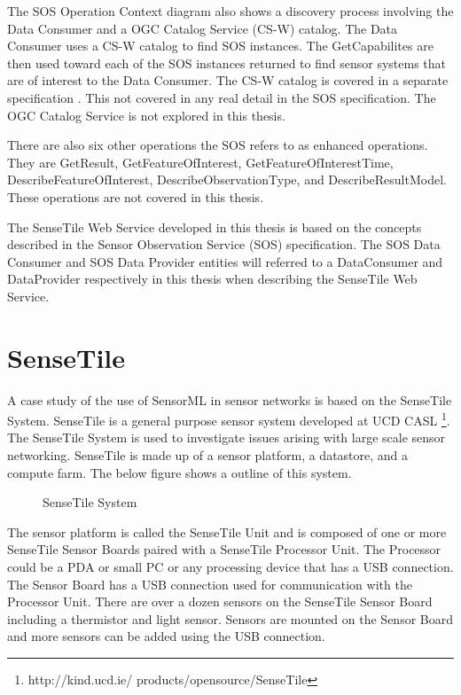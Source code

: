 \documentclass[]{final_report}
\begin{document}
The SOS Operation Context diagram also shows a discovery process involving the  Data Consumer and a OGC Catalog Service (CS-W) catalog. The Data Consumer uses a CS-W catalog to find SOS instances. The GetCapabilites are then used toward each of the SOS instances returned to find sensor systems that are of interest to the Data Consumer. The CS-W catalog is covered in a separate specification \cite{OGCcatref}. This not covered in any real detail in the SOS specification. The OGC Catalog Service is not explored in this thesis.

There are also six other operations the SOS refers to as enhanced operations. They are GetResult,
GetFeatureOfInterest, GetFeatureOfInterestTime, DescribeFeatureOfInterest,
DescribeObservationType, and DescribeResultModel. These operations are not covered in this thesis.

The SenseTile Web Service developed in this thesis is based on the concepts described in the Sensor Observation Service (SOS) specification. The SOS Data Consumer and SOS Data Provider entities will referred to a DataConsumer and DataProvider respectively in this thesis when describing the SenseTile Web Service.


\section{SenseTile}
A case study of the use of SensorML in sensor networks is based on the SenseTile System. SenseTile is a general purpose sensor system developed at UCD CASL \footnote{http://kind.ucd.ie/
products/opensource/SenseTile}. The SenseTile System is used to investigate issues arising with large scale sensor networking. SenseTile is made up of a sensor platform, a datastore, and a compute farm. The below figure shows a outline of this system. 
\begin{figure}[h]
\centering
{}
\caption{SenseTile System}\label{fig:SenseTileDescription}
\end{figure}
 The sensor platform is called the SenseTile Unit and is composed of one or more SenseTile Sensor Boards paired with a SenseTile Processor Unit. The Processor could be a PDA or small PC or any processing device that has a USB connection.  The Sensor Board has a USB connection used for communication with the Processor Unit. There are over a dozen sensors on the SenseTile Sensor Board including a thermistor and light sensor. Sensors are mounted on the Sensor Board and more sensors can be added using the USB connection.
\end{document}
